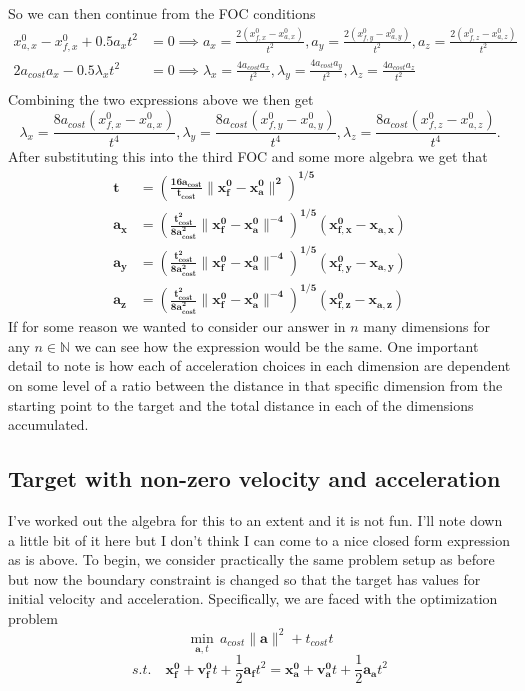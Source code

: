 \documentclass[11pt,english]{article}
\begin{document}
So we can then continue from the FOC conditions
\begin{align*}
x_{a,x}^0 - x_{f,x}^0 + 0.5a_xt^2 &= 0 \implies  a_x = \frac{2( x_{f,x}^0 - x_{a,x}^0)}{t^2}, a_y = \frac{2( x_{f,y}^0 - x_{a,y}^0)}{t^2}, a_z = \frac{2( x_{f,z}^0 - x_{a,z}^0)}{t^2}\\	
2a_{cost}a_x - 0.5\lambda_xt^2 &= 0 \implies \lambda_x = \frac{4a_{cost}a_x}{t^2}, \lambda_y = \frac{4a_{cost}a_y}{t^2}, \lambda_z = \frac{4a_{cost}a_z}{t^2}\\
\end{align*}
Combining the two expressions above we then get $$\lambda_x = \frac{8a_{cost}( x_{f,x}^0 - x_{a,x}^0)}{t^4}, \lambda_y = \frac{8a_{cost}( x_{f,y}^0 - x_{a,y}^0)}{t^4}, \lambda_z = \frac{8a_{cost}( x_{f,z}^0 - x_{a,z}^0)}{t^4}.$$ After substituting this into the third FOC and some more algebra we get that \begin{align*}
\pmb{t} &\pmb{= \left(\frac{16a_{cost}}{t_{cost}}\lVert x_{f}^0 - x_a^0 \rVert^2\right)^{1/5}}\\
\pmb{a_x} &\pmb{= \left(\frac{t_{cost}^2}{8a_{cost}^2}\lVert x_{f}^0 - x_a^0 \rVert^{-4}\right)^{1/5}(x_{f,x}^0 - x_{a,x})}\\
\pmb{a_y} &\pmb{= \left(\frac{t_{cost}^2}{8a_{cost}^2}\lVert x_{f}^0 - x_a^0 \rVert^{-4}\right)^{1/5}(x_{f,y}^0 - x_{a,y})}\\
\pmb{a_z} &\pmb{= \left(\frac{t_{cost}^2}{8a_{cost}^2}\lVert x_{f}^0 - x_a^0 \rVert^{-4}\right)^{1/5}(x_{f,z}^0 - x_{a,z})}
\end{align*}
\noindent If for some reason we wanted to consider our answer in $n$ many dimensions for any $n\in \mathbb{N}$ we can see how the expression would be the same. One important detail to note is how each of acceleration choices in each dimension are dependent on some level of a ratio between the distance in that specific dimension from the starting point to the target and the total distance in each of the dimensions accumulated.

\subsection*{Target with non-zero velocity and acceleration}

I've worked out the algebra for this to an extent and it is not fun. I'll note down a little bit of it here but I don't think I can come to a nice closed form expression as is above. To begin, we consider practically the same problem setup as before but now the boundary constraint is changed so that the target has values for initial velocity and acceleration. Specifically, we are faced with the optimization problem  $$\min_{\mathbf{a},t}\,a_{cost}\lVert\mathbf{a}\rVert^2 + t_{cost}t$$ $$s.t. \quad \mathbf{x_f^0} + \mathbf{v^0_f}t + \frac{1}{2}\mathbf{a_f}t^2= \mathbf{x_a^0} + \mathbf{v^0_a}t + \frac{1}{2}\mathbf{a_a}t^2$$
\end{document}

